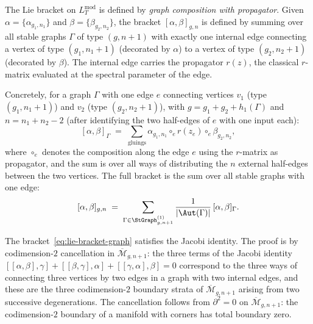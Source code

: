 \begin{definition}
The Lie bracket on $L_T^{\mathrm{mod}}$ is defined by \emph{graph
composition with propagator}. Given
$\alpha = \{\alpha_{g_1, n_1}\}$ and
$\beta = \{\beta_{g_2, n_2}\}$, the bracket
$[\alpha, \beta]_{g, n}$ is defined by summing over all stable
graphs $\Gamma$ of type $(g, n+1)$ with exactly one internal
edge connecting a vertex of type $(g_1, n_1 + 1)$ (decorated by
$\alpha$) to a vertex of type $(g_2, n_2 + 1)$ (decorated by
$\beta$). The internal edge carries the propagator $r(z)$, the
classical $r$-matrix evaluated at the spectral parameter of the
edge.

Concretely, for a graph $\Gamma$ with one edge $e$ connecting
vertices $v_1$ (type $(g_1, n_1+1)$) and $v_2$
(type $(g_2, n_2+1)$), with $g = g_1 + g_2 + h_1(\Gamma)$
and $n = n_1 + n_2 - 2$ (after identifying the two half-edges
of $e$ with one input each):
\begin{equation}
[\alpha, \beta]_\Gamma
\;=\;
\sum_{\text{gluings}}
\alpha_{g_1, n_1}
\circ_e
r(z_e)
\circ_e
\beta_{g_2, n_2},
\end{equation}
where $\circ_e$ denotes the composition along the edge $e$ using
the $r$-matrix as propagator, and the sum is over all ways of
distributing the $n$ external half-edges between the two vertices.
The full bracket is the sum over all stable graphs with one edge:
\[
[\alpha, \beta]_{g,n}
\;=\;
\sum_{\Gamma \in \StGraph_{g,n+1}^{(1)}}
\frac{1}{|\Aut(\Gamma)|}\,
[\alpha, \beta]_\Gamma.
\]
\end{definition}

\begin{proposition}
The bracket~\eqref{eq:lie-bracket-graph} satisfies the Jacobi
identity. The proof is by codimension-$2$ cancellation in
$\overline{\mathcal{M}}_{g,n+1}$: the three terms of the Jacobi
identity
$[[\alpha, \beta], \gamma] + [[\beta, \gamma], \alpha]
+ [[\gamma, \alpha], \beta] = 0$
correspond to the three ways of connecting three vertices by two
edges in a graph with two internal edges, and these are the three
codimension-$2$ boundary strata of $\overline{\mathcal{M}}_{g,n+1}$
arising from two successive degenerations. The cancellation follows
from $\partial^2 = 0$ on $\overline{\mathcal{M}}_{g,n+1}$: the
codimension-$2$ boundary of a manifold with corners has total
boundary zero.
\end{proposition}

